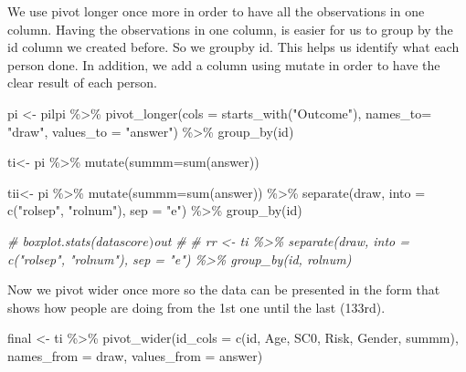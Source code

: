 \documentclass[
]{article}
\newenvironment{Shaded}{\begin{snugshade}}{\end{snugshade}}
\newcommand{\AttributeTok}[1]{\textcolor[rgb]{0.77,0.63,0.00}{#1}}
\newcommand{\CommentTok}[1]{\textcolor[rgb]{0.56,0.35,0.01}{\textit{#1}}}
\newcommand{\FunctionTok}[1]{\textcolor[rgb]{0.00,0.00,0.00}{#1}}
\newcommand{\NormalTok}[1]{#1}
\newcommand{\OtherTok}[1]{\textcolor[rgb]{0.56,0.35,0.01}{#1}}
\newcommand{\SpecialCharTok}[1]{\textcolor[rgb]{0.00,0.00,0.00}{#1}}
\newcommand{\StringTok}[1]{\textcolor[rgb]{0.31,0.60,0.02}{#1}}
\begin{document}
\begin{enumerate}
  We use pivot longer once more in order to have all the observations in
  one column. Having the observations in one column, is easier for us to
  group by the id column we created before. So we groupby id. This helps
  us identify what each person done. In addition, we add a column using
  mutate in order to have the clear result of each person.

\begin{Shaded}
\begin{Highlighting}[]
\NormalTok{pi }\OtherTok{\textless{}{-}}\NormalTok{ pilpi }\SpecialCharTok{\%\textgreater{}\%} \FunctionTok{pivot\_longer}\NormalTok{(}\AttributeTok{cols =} \FunctionTok{starts\_with}\NormalTok{(}\StringTok{"Outcome"}\NormalTok{), }\AttributeTok{names\_to=} \StringTok{"draw"}\NormalTok{, }\AttributeTok{values\_to =} \StringTok{"answer"}\NormalTok{) }\SpecialCharTok{\%\textgreater{}\%} \FunctionTok{group\_by}\NormalTok{(id) }

\NormalTok{ti}\OtherTok{\textless{}{-}}\NormalTok{ pi }\SpecialCharTok{\%\textgreater{}\%} \FunctionTok{mutate}\NormalTok{(}\AttributeTok{summm=}\FunctionTok{sum}\NormalTok{(answer))}

\NormalTok{tii}\OtherTok{\textless{}{-}}\NormalTok{ pi }\SpecialCharTok{\%\textgreater{}\%} \FunctionTok{mutate}\NormalTok{(}\AttributeTok{summm=}\FunctionTok{sum}\NormalTok{(answer)) }\SpecialCharTok{\%\textgreater{}\%} \FunctionTok{separate}\NormalTok{(draw, }\AttributeTok{into =} \FunctionTok{c}\NormalTok{(}\StringTok{"rolsep"}\NormalTok{, }\StringTok{"rolnum"}\NormalTok{), }\AttributeTok{sep =} \StringTok{"e"}\NormalTok{) }\SpecialCharTok{\%\textgreater{}\%} \FunctionTok{group\_by}\NormalTok{(id)}

\CommentTok{\# boxplot.stats(data$score)$out}
\CommentTok{\# }
\CommentTok{\# rr \textless{}{-} ti \%\textgreater{}\% separate(draw, into = c("rolsep", "rolnum"), sep = "e") \%\textgreater{}\% group\_by(id, rolnum)}
\end{Highlighting}
\end{Shaded}

  Now we pivot wider once more so the data can be presented in the form
  that shows how people are doing from the 1st one until the last
  (133rd).

\begin{Shaded}
\begin{Highlighting}[]
\NormalTok{final }\OtherTok{\textless{}{-}}\NormalTok{ ti }\SpecialCharTok{\%\textgreater{}\%}  \FunctionTok{pivot\_wider}\NormalTok{(}\AttributeTok{id\_cols =} \FunctionTok{c}\NormalTok{(id, Age, SC0, Risk, Gender, summm), }\AttributeTok{names\_from =}\NormalTok{ draw, }\AttributeTok{values\_from =}\NormalTok{ answer)}


\end{Highlighting}
\end{Shaded}
\end{enumerate}
\end{document}
